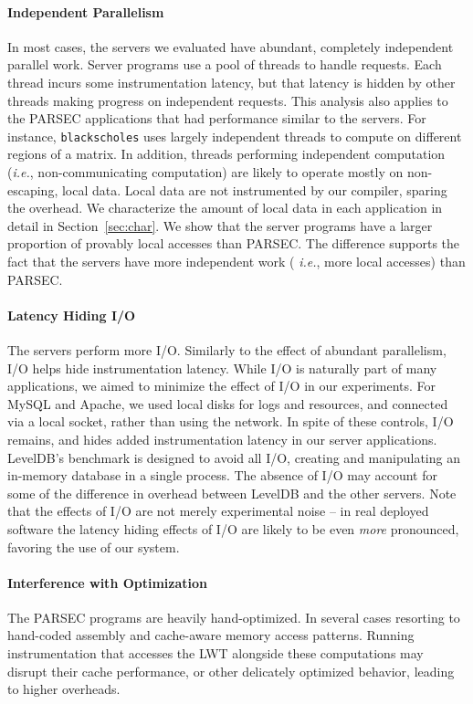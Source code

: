 \documentclass[preprint,9pt]{sigplanconf}
\newcommand{\lwt}{LWT\xspace}
\begin{document}
\paragraph{Independent Parallelism}
In most cases, the servers we evaluated have abundant, completely independent
parallel work.  Server programs use a pool of threads to handle requests.
Each thread incurs some instrumentation latency, but that latency is hidden by
other threads making progress on independent requests.  This analysis also
applies to the PARSEC applications that had performance similar to the servers.
For instance, {\tt blackscholes} uses largely independent threads to compute on
different regions of a matrix.  In addition, threads performing independent
computation ({\em i.e.}, non-communicating computation) are likely to operate
mostly on non-escaping, local data.  Local data are not instrumented by our
compiler, sparing the overhead.  We characterize the amount of local data in
each application in detail in Section~\ref{sec:char}.  We show that the server
programs have a larger proportion of provably local accesses than PARSEC.  The
difference supports the fact that the servers have more independent work ({\em
i.e.}, more local accesses) than PARSEC. 


\paragraph{Latency Hiding I/O}
The servers perform more I/O.  Similarly to the effect of abundant parallelism,
I/O helps hide instrumentation latency.  While I/O is naturally part of many
applications, we aimed to minimize the effect of I/O in our experiments.  For
MySQL and Apache, we used local disks for logs and resources, and connected via
a local socket, rather than using the network.  In spite of these controls, I/O
remains, and hides added instrumentation latency in our server applications.
LevelDB's benchmark is designed to avoid all I/O, creating and manipulating an
in-memory database in a single process.  The absence of I/O may account for some
of the difference in overhead between LevelDB and the other servers.  Note that
the effects of I/O are not merely experimental noise -- in real deployed
software the latency hiding effects of I/O are likely to be even {\em more}
pronounced, favoring the use of our system.


\paragraph{Interference with Optimization}
The PARSEC programs are heavily hand-optimized. In several cases
resorting to hand-coded assembly and cache-aware memory access patterns.
Running instrumentation that accesses the \lwt alongside these computations may
disrupt their cache performance, or other delicately optimized behavior,
leading to higher overheads.  
\end{document}
